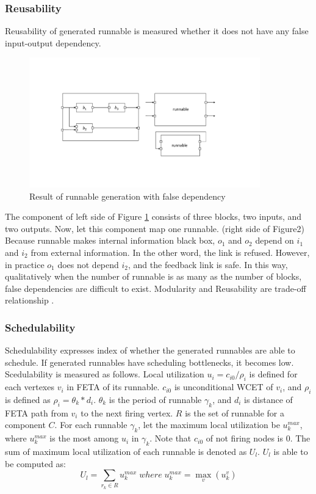 \documentclass[conference,compsoc]{IEEEtran}
\begin{document}
\subsubsection{Reusability}
 Reusability of generated runnable is measured whether it does not have any false input-output dependency.
\begin{figure}
	\centering
	\includegraphics[width=10cm,clip]{figure6.pdf}
	\caption{Result of runnable generation with false dependency}
	\label{fig7}
\end{figure}
 The component of left side of Figure \ref{fig7} consists of three blocks, two inputs, and two outputs.
Now, let this component map one runnable. (right side of Figure2)
Because runnable makes internal information black box, $o_1$ and $o_2$ depend on $i_1$ and $i_2$ from external information.
In the other word, the link is refused.
However, in practice $o_1$ does not depend $i_2$, and the feedback link is safe. 
In this way, qualitatively when the number of runnable is as many as the number of blocks, false dependencies are difficult to exist.
Modularity and Reusability are trade-off relationship \cite{}.
\subsubsection{Schedulability}
 Schedulability expresses index of whether the generated runnables are able to schedule.
If generated runnables have scheduling bottlenecks, it becomes low.
Scedulability is measured as follows.
 Local utilization $u_i = c_{i0} / \rho_i$ is defined for each vertexes $v_i$ in  FETA \cite{Lublinerman:2009:MCG:1480881.1480893} of its runnable.
$c_{i0}$ is unconditional WCET of $v_i$, and $\rho_i$ is defined as $\rho_i = \theta_k * d_i$.
$\theta_k$ is the period of runnable  $\gamma_k$, and $d_i$ is distance of FETA path from $v_i$ to the next firing vertex.
$R$ is the set of runnable for a component $C$.
For each runnable $\gamma_k$, let the maximum local utilization  be $u_{k}^{max}$, where $u_k^{max}$ is the most among $u_i$ in $\gamma_k$.  
Note that $c_{i0}$ of not firing nodes is 0.
The sum of maximum local utilization of each runnable is denoted as $U_l$.
$U_l$ is able to be computed as:
\begin{equation}
 U_l = \sum_{r_k \in R} u_{k}^{max}\;where\;u_{k}^{max} = \max_{v}(u_{k}^{v})
\end{equation}
\end{document}
